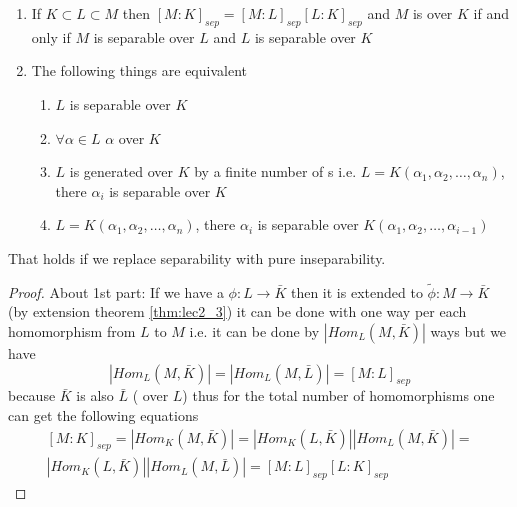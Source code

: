 \begin{theorem}
  \begin{enumerate}
  \item If $K \subset L \subset M$ then
    $\left[M:K\right]_{sep} = \left[M:L\right]_{sep}
    \left[L:K\right]_{sep}$
    and $M$ is  over $K$ if and only
    if $M$ is separable over $L$ and $L$ is separable over $K$
  \item The following things are equivalent
    \begin{enumerate}
    \item $L$ is separable over $K$ \label{thm:lec3_3:itm:1}
    \item $\forall \alpha \in L$ $\alpha$ 
      over $K$ \label{thm:lec3_3:itm:2}
    \item $L$ is generated over $K$ by a finite number of
      s i.e.
      $L = K\left(\alpha_1, \alpha_2, \dots, \alpha_n\right)$, there
      $\alpha_i$ is separable over $K$
      \label{thm:lec3_3:itm:3}
    \item   $L = K\left(\alpha_1, \alpha_2, \dots, \alpha_n\right)$, there
      $\alpha_i$ is separable over
      $K\left(\alpha_1, \alpha_2, \dots, \alpha_{i-1}\right)$
      \label{thm:lec3_3:itm:4}
    \end{enumerate}
  \end{enumerate}
  \begin{remark}
    That holds if we replace separability with pure inseparability.
  \end{remark}
  \label{thm:lec3_3}
  \begin{proof}
    About 1st part:
    If we have a  $\phi: L \to \bar{K}$ then
    it is extended to $\tilde{\phi}: M \to \bar{K}$ (by extension
    theorem \ref{thm:lec2_3}) it can be done with one way per each
    homomorphism from $L$ to $M$ i.e. it can be done by
    $\left|Hom_L\left(M, \bar{K}\right)\right|$ ways but we have
    \[
    \left|Hom_L\left(M, \bar{K}\right)\right| =
    \left|Hom_L\left(M, \bar{L}\right)\right| = \left[M:L\right]_{sep}
    \]
    because $\bar{K}$ is also
    $\bar{L}$ ( over $L$) thus for the
    total number of homomorphisms one can get the following 
    equations 
    \begin{eqnarray}
      \left[M:K\right]_{sep} = 
      \left|Hom_K\left(M, \bar{K}\right)\right| =
      \left|Hom_K\left(L, \bar{K}\right)\right|
      \left|Hom_L\left(M, \bar{K}\right)\right| =
      \nonumber \\
      \left|Hom_K\left(L, \bar{K}\right)\right|
      \left|Hom_L\left(M, \bar{L}\right)\right| =
      \left[M:L\right]_{sep} \left[L:K\right]_{sep}
      \nonumber
    \end{eqnarray}


\end{proof}
\end{theorem}

